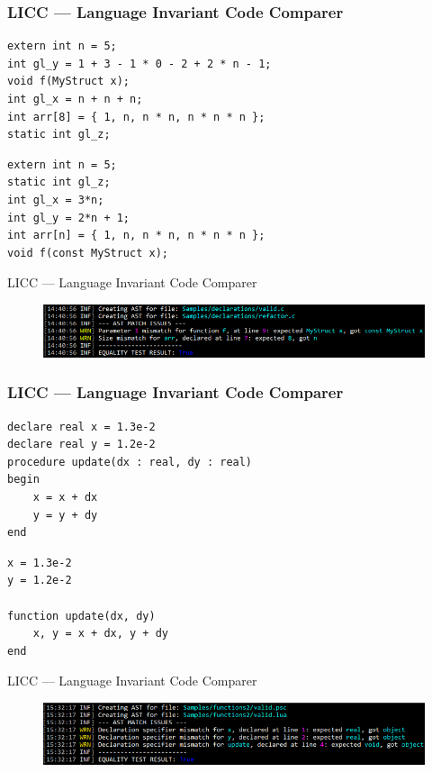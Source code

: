 \documentclass{beamer}
\begin{document}
\begin{frame}[fragile]
    \frametitle{LICC --- Language Invariant Code Comparer}
\begin{lstlisting}
extern int n = 5;
int gl_y = 1 + 3 - 1 * 0 - 2 + 2 * n - 1;
void f(MyStruct x);
int gl_x = n + n + n;
int arr[8] = { 1, n, n * n, n * n * n };
static int gl_z;
\end{lstlisting}
\begin{lstlisting}
extern int n = 5;
static int gl_z;
int gl_x = 3*n;
int gl_y = 2*n + 1;
int arr[n] = { 1, n, n * n, n * n * n };
void f(const MyStruct x);
\end{lstlisting}
\end{frame}

\begin{frame}{LICC --- Language Invariant Code Comparer}
    \begin{figure}[h!]
        \centering
        \includegraphics[scale=0.58]{images/eval/decl_valid_refactor.PNG}
    \end{figure}
\end{frame}


\begin{frame}[fragile]
    \frametitle{LICC --- Language Invariant Code Comparer}
\begin{lstlisting}
declare real x = 1.3e-2
declare real y = 1.2e-2
procedure update(dx : real, dy : real)
begin
    x = x + dx
    y = y + dy
end
\end{lstlisting}
\begin{lstlisting}
x = 1.3e-2
y = 1.2e-2

function update(dx, dy)
    x, y = x + dx, y + dy
end
\end{lstlisting}
\end{frame}

\begin{frame}{LICC --- Language Invariant Code Comparer}
    \begin{figure}[h!]
        \centering
        \includegraphics[scale=0.55]{images/eval/fparams_valid_valid.PNG}
    \end{figure}
\end{frame}
\end{document}
